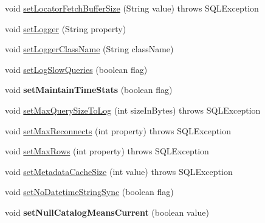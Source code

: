 \begin{DoxyCompactItemize}
\item 
void \mbox{\hyperlink{classcom_1_1mysql_1_1jdbc_1_1_connection_properties_impl_a1214ced2b9a6dbbaebd36c45acb2538b}{set\+Locator\+Fetch\+Buffer\+Size}} (String value)  throws S\+Q\+L\+Exception 
\item 
void \mbox{\hyperlink{classcom_1_1mysql_1_1jdbc_1_1_connection_properties_impl_aba563c4b80406355d1d10ac2f9f109f9}{set\+Logger}} (String property)
\item 
void \mbox{\hyperlink{classcom_1_1mysql_1_1jdbc_1_1_connection_properties_impl_ae8b725b385d279e4d89dd6cb2bae641d}{set\+Logger\+Class\+Name}} (String class\+Name)
\item 
void \mbox{\hyperlink{classcom_1_1mysql_1_1jdbc_1_1_connection_properties_impl_ada15c217d411baff531aeeed04b0690f}{set\+Log\+Slow\+Queries}} (boolean flag)
\item 
\mbox{\label{classcom_1_1mysql_1_1jdbc_1_1_connection_properties_impl_a339c13b770f8ec68e500bf2f12e78bac}} 
void {\bfseries set\+Maintain\+Time\+Stats} (boolean flag)
\item 
void \mbox{\hyperlink{classcom_1_1mysql_1_1jdbc_1_1_connection_properties_impl_a47edb53f9c786011c632b6aa2a524e93}{set\+Max\+Query\+Size\+To\+Log}} (int size\+In\+Bytes)  throws S\+Q\+L\+Exception 
\item 
void \mbox{\hyperlink{classcom_1_1mysql_1_1jdbc_1_1_connection_properties_impl_a240be4b60c27f02489e6b7b0b50a7e8a}{set\+Max\+Reconnects}} (int property)  throws S\+Q\+L\+Exception 
\item 
void \mbox{\hyperlink{classcom_1_1mysql_1_1jdbc_1_1_connection_properties_impl_ab68e0b343a7cbdbefb2b9163680e3060}{set\+Max\+Rows}} (int property)  throws S\+Q\+L\+Exception 
\item 
void \mbox{\hyperlink{classcom_1_1mysql_1_1jdbc_1_1_connection_properties_impl_ab678e3d922115fa48bda9b44611aca06}{set\+Metadata\+Cache\+Size}} (int value)  throws S\+Q\+L\+Exception 
\item 
void \mbox{\hyperlink{classcom_1_1mysql_1_1jdbc_1_1_connection_properties_impl_acd5096d201db849e11a80ddfb49c5c7e}{set\+No\+Datetime\+String\+Sync}} (boolean flag)
\item 
\mbox{\label{classcom_1_1mysql_1_1jdbc_1_1_connection_properties_impl_a91511370d4956aa117cc0c9d429243b0}} 
void {\bfseries set\+Null\+Catalog\+Means\+Current} (boolean value)

\end{DoxyCompactItemize}
